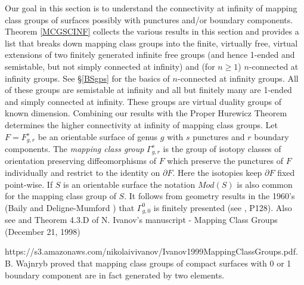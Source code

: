 \documentclass[12pt]{article}
\begin{document}
Our goal in this section is to understand the connectivity at infinity of mapping class groups of surfaces possibly with punctures and/or boundary components. Theorem \ref{MCGSCINF} collects the various results in this section and provides a list that breaks down mapping class groups into the finite, virtually free, virtual extensions of two finitely generated infinite free groups (and hence 1-ended and semistable, but not simply connected at infinity) and (for $n\geq 1$) $n$-connected at infinity groups. See \S \ref{BSgps} for the basics of $n$-connected at infinity groups.  All of these groups are semistable at infinity and all but finitely many are 1-ended and simply connected at infinity. These groups are virtual duality groups of known dimension. Combining our results with the Proper Hurewicz Theorem determines the higher connectivity at infinity of mapping class groups. Let $F=F_{g,r}^s$ be an orientable surface of genus $g$ with $s$ punctures and $r$ boundary components. The {\it mapping class group} $\Gamma_{g,r}^s$  is the group of isotopy classes of orientation preserving diffeomorphisms of $F$ which preserve the punctures of $F$ individually and restrict to the identity on $\partial F$. Here the isotopies keep $\partial F$ fixed point-wise. If $S$ is an orientable surface the notation $Mod(S)$ is also common for the mapping class group of $S$.  
 It follows from geometry results in the 1960's (Baily \cite{B60} and Deligne-Mumford \cite{DM69}) that $\Gamma_{g,0}^0$ is finitely presented (see \cite{FM12}, P128).
Also see \cite{McC75} and Theorem 4.3.D of N. Ivanov's manuscript - Mapping Class Groups (December 21, 1998) 

\noindent https://s3.amazonaws.com/nikolaivivanov/Ivanov1999MappingClassGroups.pdf. 
B. Wajnryb \cite{Waj96} proved that mapping class groups of compact surfaces with 0 or 1 boundary component are in fact generated by two elements. 

\end{document}
